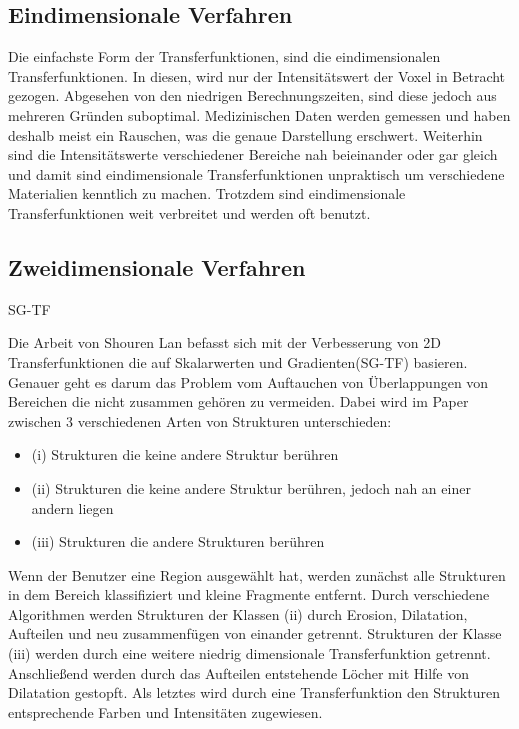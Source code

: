 \subsection{Eindimensionale Verfahren}

Die einfachste Form der Transferfunktionen, sind die eindimensionalen Transferfunktionen. In diesen, wird nur der Intensitätswert der Voxel in Betracht gezogen. Abgesehen von den niedrigen Berechnungszeiten, sind diese jedoch aus mehreren Gründen suboptimal. Medizinischen Daten werden gemessen und haben deshalb meist ein Rauschen, was die genaue Darstellung erschwert. Weiterhin sind die Intensitätswerte verschiedener Bereiche nah beieinander oder gar gleich und damit sind eindimensionale Transferfunktionen unpraktisch um verschiedene Materialien kenntlich zu machen. Trotzdem sind eindimensionale Transferfunktionen weit verbreitet und werden oft benutzt. 
\newline


\subsection{Zweidimensionale Verfahren}



\cite{kniss2002multidimensional} SG-TF


Die Arbeit von Shouren Lan \cite{lan2017improving} befasst sich mit der Verbesserung von 2D Transferfunktionen die auf Skalarwerten und Gradienten(SG-TF) basieren. Genauer geht es darum das Problem vom Auftauchen von Überlappungen von Bereichen die nicht zusammen gehören zu vermeiden.
\newline
Dabei wird im Paper zwischen 3 verschiedenen Arten von Strukturen unterschieden:
\begin{itemize}
\item (i) Strukturen die keine andere Struktur berühren
\item (ii) Strukturen die keine andere Struktur berühren, jedoch nah an einer andern liegen
\item (iii) Strukturen die andere Strukturen berühren
\end{itemize} 
Wenn der Benutzer eine Region ausgewählt hat, werden zunächst alle Strukturen in dem Bereich klassifiziert und kleine Fragmente entfernt. Durch verschiedene Algorithmen werden Strukturen der Klassen (ii) durch Erosion, Dilatation, Aufteilen und neu zusammenfügen von einander getrennt. Strukturen der Klasse (iii) werden durch eine weitere niedrig dimensionale Transferfunktion getrennt. Anschließend werden durch das Aufteilen entstehende Löcher mit Hilfe von Dilatation gestopft. Als letztes wird durch eine Transferfunktion den Strukturen entsprechende Farben und Intensitäten zugewiesen.





